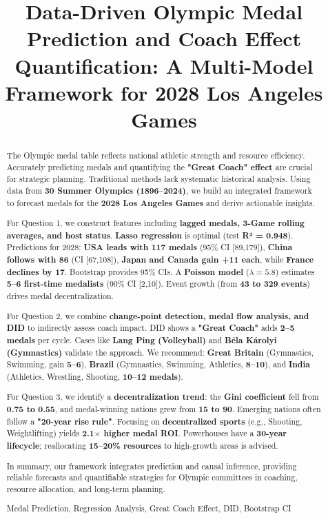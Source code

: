 \documentclass{mcmthesis}
\title{Data-Driven Olympic Medal Prediction and Coach Effect Quantification: A Multi-Model Framework for 2028 Los Angeles Games}
\begin{document}
\setlength{\parindent}{1.5em} 

\begin{abstract}
\setlength{\parindent}{1.5em} 

The Olympic medal table reflects national athletic strength and resource efficiency. Accurately predicting medals and quantifying the \textbf{"Great Coach" effect} are crucial for strategic planning. Traditional methods lack systematic historical analysis. Using data from \textbf{30 Summer Olympics (1896--2024)}, we build an integrated framework to forecast medals for the \textbf{2028 Los Angeles Games} and derive actionable insights.

For Question 1, we construct features including \textbf{lagged medals, 3-Game rolling averages, and host status}. \textbf{Lasso regression} is optimal (test \textbf{R² = 0.948}). Predictions for 2028: \textbf{USA leads with 117 medals} (95\% CI [89,179]), \textbf{China follows with 86} (CI [67,108]), \textbf{Japan and Canada gain +11 each}, while \textbf{France declines by 17}. Bootstrap provides 95\% CIs. A \textbf{Poisson model} (\(\lambda = 5.8\)) estimates \textbf{5–6 first-time medalists} (90\% CI [2,10]). Event growth (from \textbf{43 to 329 events}) drives medal decentralization.

For Question 2, we combine \textbf{change-point detection, medal flow analysis, and DID} to indirectly assess coach impact. DID shows a \textbf{"Great Coach"} adds \textbf{2–5 medals} per cycle. Cases like \textbf{Lang Ping (Volleyball)} and \textbf{Béla Károlyi (Gymnastics)} validate the approach. We recommend: \textbf{Great Britain} (Gymnastics, Swimming, gain \textbf{5--6}), \textbf{Brazil} (Gymnastics, Swimming, Athletics, \textbf{8--10}), and \textbf{India} (Athletics, Wrestling, Shooting, \textbf{10--12 medals}).

For Question 3, we identify a \textbf{decentralization trend}: the \textbf{Gini coefficient} fell from \textbf{0.75 to 0.55}, and medal-winning nations grew from \textbf{15 to 90}. Emerging nations often follow a \textbf{"20-year rise rule"}. Focusing on \textbf{decentralized sports} (e.g., Shooting, Weightlifting) yields \textbf{2.1$\times$ higher medal ROI}. Powerhouses have a \textbf{30-year lifecycle}; reallocating \textbf{15--20\% resources} to high-growth areas is advised.

In summary, our framework integrates prediction and causal inference, providing reliable forecasts and quantifiable strategies for Olympic committees in coaching, resource allocation, and long-term planning.
\small
\begin{keywords}
Medal Prediction, Regression Analysis, Great Coach Effect, DID, Bootstrap CI
\end{keywords}
\end{abstract}
\maketitle
 \tableofcontents
 \newpage
\end{document}
